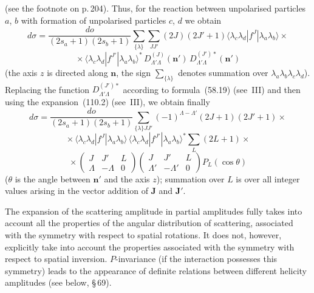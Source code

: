 (see the footnote on p.\,204). Thus, for the reaction between unpolarised particles $a$, $b$ with formation of unpolarised particles $c$, $d$ we obtain
\begin{equation}
d\sigma = \frac{do}{(2s_a+1)(2s_b+1)}\sum_{\{\lambda\}}\sum_{JJ'}(2J)(2J'+1)\langle\lambda_c\lambda_d|f^J|\lambda_a\lambda_b\rangle \times{}
\tag{68.15}
\end{equation}
\[
{}\times \langle\lambda_c\lambda_d|f^{J'}|\lambda_a\lambda_b\rangle^*\,D^{(J)}_{\Lambda'\Lambda}(\mathbf{n}')\,D^{(J')*}_{\Lambda'\Lambda}(\mathbf{n}')
\]
(the axis $z$ is directed along $\mathbf{n}$, the sign $\sum_{\{\lambda\}}$ denotes summation over $\lambda_a\lambda_b\lambda_c\lambda_d$). Replacing the function $D^{(J')*}_{\Lambda'\Lambda}$ according to formula~(58.19) (see~III) and then using the expansion~(110.2) (see~III), we obtain finally
\begin{equation}
d\sigma = \frac{do}{(2s_a+1)(2s_b+1)}\sum_{\{\lambda\}JJ'}(-1)^{\Lambda-\Lambda'}(2J+1)(2J'+1) \times{}
\tag{68.16}
\end{equation}
\[
{}\times \langle\lambda_c\lambda_d|f^J|\lambda_a\lambda_b\rangle\,\langle\lambda_c\lambda_d|f^{J'}|\lambda_a\lambda_b\rangle^*\sum_L(2L+1) \times{}
\]
\[
{}\times \begin{pmatrix}J & J' & L\\ \Lambda & -\Lambda & 0\end{pmatrix}\begin{pmatrix}J & J' & L\\ \Lambda' & -\Lambda' & 0\end{pmatrix}P_L(\cos\theta)
\]
($\theta$ is the angle between $\mathbf{n}'$ and the axis $z$); summation over $L$ is over all integer values arising in the vector addition of $\mathbf{J}$ and $\mathbf{J}'$.

The expansion of the scattering amplitude in partial amplitudes fully takes into account all the properties of the angular distribution of scattering, associated with the symmetry with respect to spatial rotations. It does not, however, explicitly take into account the properties associated with the symmetry with respect to spatial inversion. $P$-invariance (if the interaction possesses this symmetry) leads to the appearance of definite relations between different helicity amplitudes (see below, \S\,69).
